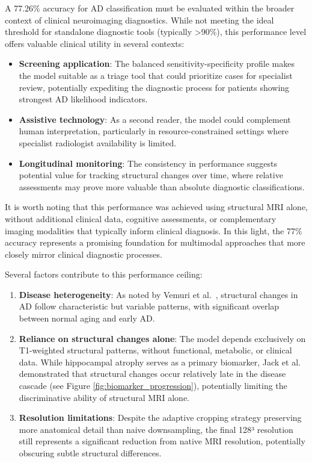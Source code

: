 \documentclass[12pt, a4paper]{article}
\begin{document}
A 77.26\% accuracy for AD classification must be evaluated within the broader context of clinical neuroimaging diagnostics. While not meeting the ideal threshold for standalone diagnostic tools (typically >90\%), this performance level offers valuable clinical utility in several contexts:

\begin{itemize}
    \item \textbf{Screening application}: The balanced sensitivity-specificity profile makes the model suitable as a triage tool that could prioritize cases for specialist review, potentially expediting the diagnostic process for patients showing strongest AD likelihood indicators.
    
    \item \textbf{Assistive technology}: As a second reader, the model could complement human interpretation, particularly in resource-constrained settings where specialist radiologist availability is limited.
    
    \item \textbf{Longitudinal monitoring}: The consistency in performance suggests potential value for tracking structural changes over time, where relative assessments may prove more valuable than absolute diagnostic classifications.
\end{itemize}

It is worth noting that this performance was achieved using structural MRI alone, without additional clinical data, cognitive assessments, or complementary imaging modalities that typically inform clinical diagnosis. In this light, the 77\% accuracy represents a promising foundation for multimodal approaches that more closely mirror clinical diagnostic processes.

Several factors contribute to this performance ceiling:

\begin{enumerate}
    \item \textbf{Disease heterogeneity}: As noted by Vemuri et al.~\cite{vemuri2010role}, structural changes in AD follow characteristic but variable patterns, with significant overlap between normal aging and early AD.
    
    \item \textbf{Reliance on structural changes alone}: The model depends exclusively on T1-weighted structural patterns, without functional, metabolic, or clinical data. While hippocampal atrophy serves as a primary biomarker, Jack et al.~\cite{jack2013tracking} demonstrated that structural changes occur relatively late in the disease cascade (see Figure \ref{fig:biomarker_progression}), potentially limiting the discriminative ability of structural MRI alone.
    
    \item \textbf{Resolution limitations}: Despite the adaptive cropping strategy preserving more anatomical detail than naive downsampling, the final 128³ resolution still represents a significant reduction from native MRI resolution, potentially obscuring subtle structural differences.
\end{enumerate}
\end{document}
